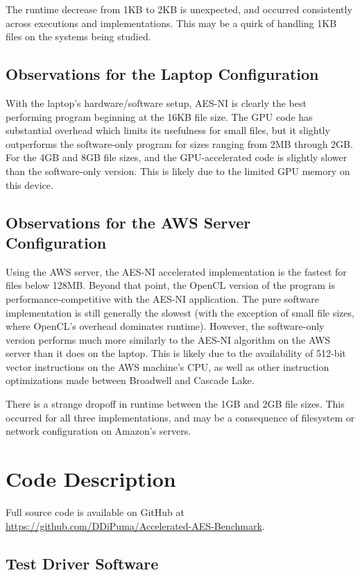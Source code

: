 \documentclass[a4paper,10pt]{article}
\begin{document}
The runtime decrease from 1KB to 2KB is unexpected, and occurred consistently across executions and implementations.  This may be a quirk of handling 1KB files on the systems being studied.

\subsection{Observations for the Laptop Configuration}

With the laptop's hardware/software setup, AES-NI is clearly the best performing program beginning at the 16KB  file size.  The GPU code has substantial overhead which limits its usefulness for small files, but it slightly outperforms the software-only program for sizes ranging from 2MB through 2GB. For the 4GB and 8GB file sizes, and the GPU-accelerated code is slightly slower than the software-only version.  This is likely due to the limited GPU memory on this device.

\subsection{Observations for the AWS Server Configuration}

Using the AWS server, the AES-NI accelerated implementation is the fastest for files below 128MB.  Beyond that point, the OpenCL version of the program is performance-competitive with the AES-NI application.  The pure software implementation is still generally the slowest (with the exception of small file sizes, where OpenCL's overhead dominates runtime).  However, the software-only version performs much more similarly to the AES-NI algorithm on the AWS server than it does on the laptop.  This is likely due to the availability of 512-bit vector instructions on the AWS machine's CPU, as well as other instruction optimizations made between Broadwell and Cascade Lake.

There is a strange dropoff in runtime between the 1GB and 2GB file sizes.  This occurred for all three implementations, and may be a consequence of filesystem or network configuration on Amazon's servers.

\section{Code Description}

Full source code is available on GitHub at \url{https://github.com/DDiPuma/Accelerated-AES-Benchmark}.

\subsection{Test Driver Software}
\end{document}
